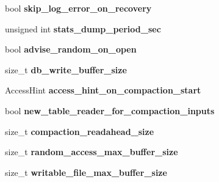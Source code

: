 \begin{DoxyCompactItemize}
\item 
bool {\bfseries skip\+\_\+log\+\_\+error\+\_\+on\+\_\+recovery}\hypertarget{structrocksdb_1_1DBOptions_aec1622bde76ec56c47bae87fb19e479d}{}\label{structrocksdb_1_1DBOptions_aec1622bde76ec56c47bae87fb19e479d}

\item 
unsigned int {\bfseries stats\+\_\+dump\+\_\+period\+\_\+sec}\hypertarget{structrocksdb_1_1DBOptions_a004866a30f79640d98c646c2b248a372}{}\label{structrocksdb_1_1DBOptions_a004866a30f79640d98c646c2b248a372}

\item 
bool {\bfseries advise\+\_\+random\+\_\+on\+\_\+open}\hypertarget{structrocksdb_1_1DBOptions_ab8a7b88f235cf5745b073ea2d799aab5}{}\label{structrocksdb_1_1DBOptions_ab8a7b88f235cf5745b073ea2d799aab5}

\item 
size\+\_\+t {\bfseries db\+\_\+write\+\_\+buffer\+\_\+size}\hypertarget{structrocksdb_1_1DBOptions_af1542493f100003fb3a1de29d6c37f69}{}\label{structrocksdb_1_1DBOptions_af1542493f100003fb3a1de29d6c37f69}

\item 
Access\+Hint {\bfseries access\+\_\+hint\+\_\+on\+\_\+compaction\+\_\+start}\hypertarget{structrocksdb_1_1DBOptions_a6be9d7a11b2050d11a709e9db0147d8e}{}\label{structrocksdb_1_1DBOptions_a6be9d7a11b2050d11a709e9db0147d8e}

\item 
bool {\bfseries new\+\_\+table\+\_\+reader\+\_\+for\+\_\+compaction\+\_\+inputs}\hypertarget{structrocksdb_1_1DBOptions_a528c773705773c219406a38866d1add8}{}\label{structrocksdb_1_1DBOptions_a528c773705773c219406a38866d1add8}

\item 
size\+\_\+t {\bfseries compaction\+\_\+readahead\+\_\+size}\hypertarget{structrocksdb_1_1DBOptions_abae810e6352793500cb748a970248836}{}\label{structrocksdb_1_1DBOptions_abae810e6352793500cb748a970248836}

\item 
size\+\_\+t {\bfseries random\+\_\+access\+\_\+max\+\_\+buffer\+\_\+size}\hypertarget{structrocksdb_1_1DBOptions_ace1cce7e8f1cfe2b12247bdb8751ce2a}{}\label{structrocksdb_1_1DBOptions_ace1cce7e8f1cfe2b12247bdb8751ce2a}

\item 
size\+\_\+t {\bfseries writable\+\_\+file\+\_\+max\+\_\+buffer\+\_\+size}\hypertarget{structrocksdb_1_1DBOptions_a4c4efda9615704dc07bc278957e33c16}{}\label{structrocksdb_1_1DBOptions_a4c4efda9615704dc07bc278957e33c16}


\end{DoxyCompactItemize}
